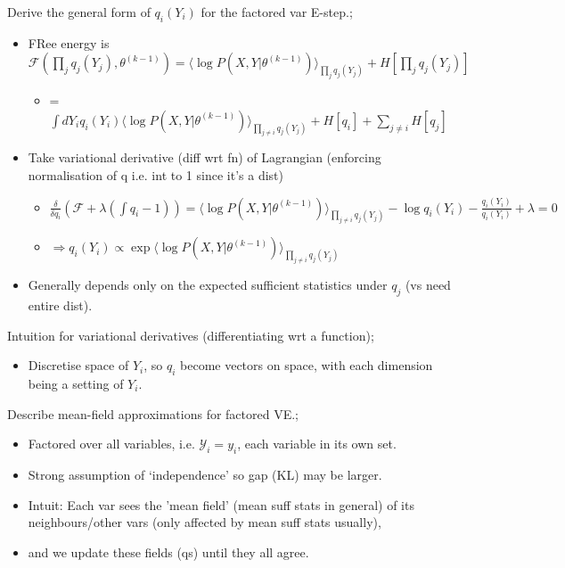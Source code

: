 \documentclass{article}
\begin{document}
Derive the general form of $q_i(Y_i)$ for the factored var E-step.; \begin{itemize} \item FRee energy is $\mathcal{F}(\prod_j q_j(Y_j),\theta^{(k-1)}) = \langle \log P(X,Y|\theta^{(k-1)})\rangle_{\prod_j q_j(Y_j)} +H[\prod_jq_j(Y_j)]$ \begin{itemize} \item = $\int dY_i q_i(Y_i)  \langle \log P(X,Y|\theta^{(k-1)})\rangle_{\prod_{j\ne i} q_j(Y_j)} +H[q_i] +\sum_{j\ne i}H[q_j]$ \end{itemize} \item Take variational derivative (diff wrt fn) of Lagrangian (enforcing normalisation of q i.e. int to 1 since it's a dist) \begin{itemize} \item $\frac{\delta}{\delta q_i} (\mathcal{F}+\lambda (\int q_i - 1)) =  \langle \log P(X,Y|\theta^{(k-1)})\rangle_{\prod_{j\ne i} q_j(Y_j)}- \log q_i(Y_i) - \frac{q_i(Y_i)}{q_i(Y_i)}+\lambda = 0$ \item $\Rightarrow q_i(Y_i) \propto \exp  \langle \log P(X,Y|\theta^{(k-1)})\rangle_{\prod_{j\ne i} q_j(Y_j)}$ \end{itemize} \item Generally depends only on the expected sufficient statistics under $q_j$ (vs need entire dist).  \end{itemize}

Intuition for variational derivatives (differentiating wrt a function); \begin{itemize} \item Discretise space of $Y_i$, so $q_i$ become vectors on space, with each dimension being a setting of $Y_i$.  \end{itemize}

Describe mean-field approximations for factored VE.; \begin{itemize} \item Factored over all variables, i.e. $\mathcal{Y}_i = y_i$, each variable in its own set.  \item Strong assumption of `independence' so gap (KL) may be larger.  \item Intuit: Each var sees the 'mean field' (mean suff stats in general) of its neighbours/other vars (only affected by mean suff stats usually), \item and we update these fields (qs) until they all agree.  \end{itemize} 
\end{document}
